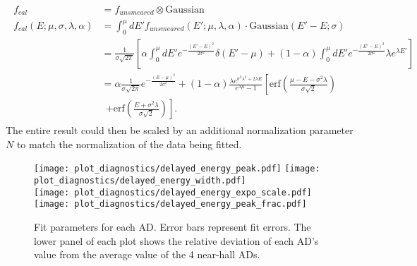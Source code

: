 \begin{align}
    \begin{split}
    f_{cal}    &= f_{unsmeared} \otimes \text{Gaussian} \\
    f_{cal}(E;\mu,\sigma,\lambda,\alpha) &= \int_0^\mu dE'
    f_{unsmeared}(E';\mu,\lambda,\alpha) \cdot \text{Gaussian}(E'-E; \sigma) \\
               &= \frac{1}{\sigma\sqrt{2\pi}}
               \left[
                   \alpha\int_0^\mu dE' e^{-\frac{(E'-E)^2}{2\sigma^2}} \delta(E'-\mu)
                   + (1-\alpha)\int_0^\mu dE' e^{-\frac{(E'-E)^2}{2\sigma^2}}
                   \lambda e^{\lambda E'}
               \right] \\
               &= \alpha\frac{1}{\sigma\sqrt{2\pi}}e^{-\frac{(E-\mu)^2}{2\sigma^2}}
               + (1-\alpha)
               \frac{\lambda e^{\sigma^2\lambda^2+2\lambda E}}{e^{\lambda\mu}-1}
               \left[
                   \text{erf}
                   \left(
                       \frac{\mu-E-\sigma^2\lambda}{\sigma\sqrt{2}}
                   \right)
                   \right. \\
               &\ \ \left.
                   + \text{erf}
                   \left(
                       \frac{E + \sigma^2\lambda}{\sigma\sqrt{2}}
                   \right)
               \right].
    \end{split}
\end{align}
The entire result could then be scaled
by an additional normalization parameter $N$
to match the normalization of the data being fitted.


\begin{figure}
    \centering
    \texttt{[image: plot\_diagnostics/delayed\_energy\_peak.pdf]}
    \vspace{0.5cm}\hspace{0.5cm}
    \texttt{[image: plot\_diagnostics/delayed\_energy\_width.pdf]}\\
    \texttt{[image: plot\_diagnostics/delayed\_energy\_expo\_scale.pdf]}
    \hspace{0.5cm}
    \texttt{[image: plot\_diagnostics/delayed\_energy\_peak\_frac.pdf]}\\
    \caption[Delayed energy fit parameters]{
        Fit parameters for each AD.
        Error bars represent fit errors.
        The lower panel of each plot shows the relative deviation of each AD's value
        from the average value of the 4 near-hall ADs.
    }

    \label{fig:delayed_fit_parameters}
\end{figure}

